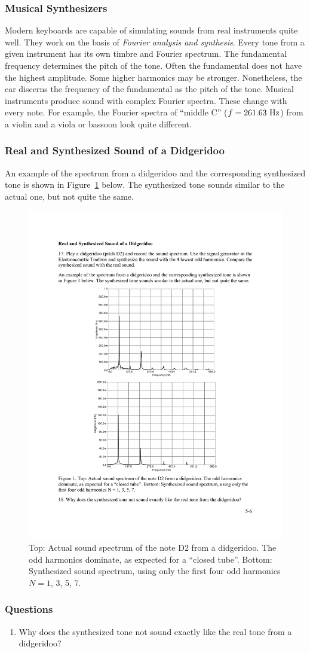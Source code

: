 \documentclass[11pt]{NSF}
\def\ben{\begin{enumerate}}
\def\een{\end{enumerate}}
\def\i{\item{}}
\begin{document}
\subsubsection{Musical Synthesizers}

Modern keyboards are capable of simulating sounds from real 
instruments quite well. 
They work on the basis of {\em Fourier analysis and synthesis}. 
Every tone from a given instrument has its own timbre and Fourier spectrum. 
The fundamental frequency determines the pitch of the tone. 
Often the fundamental does not have the highest amplitude. 
Some higher harmonics may be stronger. 
Nonetheless, the ear discerns the frequency of the fundamental 
as the pitch of the tone. 
Musical instruments produce sound with complex Fourier spectra. 
These change with every note. 
For example, the Fourier spectra of “middle C” ($f = 261.63~{\rm Hz}$) 
from a violin and a viola or bassoon look quite different.

\subsubsection{Real and Synthesized Sound of a Didgeridoo}

An example of the spectrum from a didgeridoo and the 
corresponding synthesized tone is shown in Figure~\ref{f:1} below. 
The synthesized tone sounds similar to the actual one, but not quite the same.
%
\begin{figure}[hbtp]
\begin{center}
\includegraphics[width=.7\textwidth]{fig5_1}
\caption{Top: Actual sound spectrum of the note D2 from a didgeridoo. 
The odd harmonics dominate, as expected for a ``closed tube”. 
Bottom: Synthesized sound spectrum, using only the first four odd harmonics 
$N = 1$, 3, 5, 7.}
\label{f:1} 
\end{center} 
\end{figure}
%

\subsubsection*{Questions}
\ben
\i Why does the synthesized tone not sound
exactly like the real tone from a didgeridoo?
\een
\end{document}
